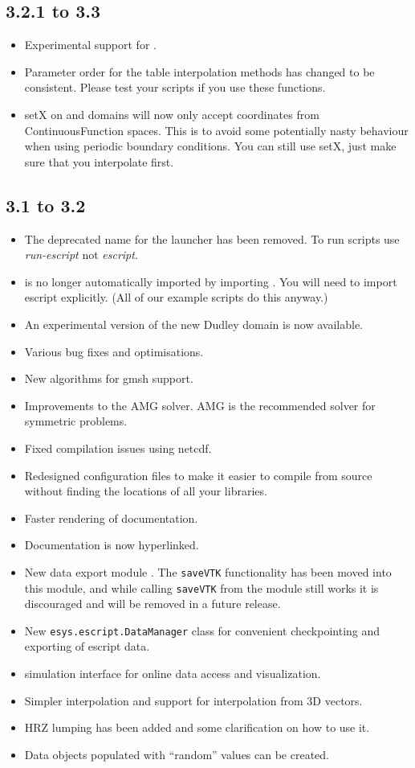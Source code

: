 \subsection*{3.2.1 to 3.3}
\begin{itemize}
 \item Experimental support for \pythonthree.
 \item Parameter order for the table interpolation methods has changed to be consistent. 
 Please test your scripts if you use these functions.
 \item setX on \finley and \dudley domains will now only accept coordinates from ContinuousFunction spaces.
 This is to avoid some potentially nasty behaviour when using periodic boundary conditions.
 You can still use setX, just make sure that you interpolate first.
\end{itemize}


\subsection*{3.1 to 3.2}
\begin{itemize}
\item The deprecated name for the launcher has been removed. To run scripts use
    \emph{run-escript} not \emph{escript}.
\item \escript is no longer automatically imported by importing \finley.
    You will need to import escript explicitly. (All of our example scripts do this anyway.)
\item An experimental version of the new Dudley domain is now available.
\item Various bug fixes and optimisations.
\item New algorithms for gmsh support.
\item Improvements to the AMG solver. AMG is the recommended solver for symmetric problems.
\item Fixed compilation issues using netcdf.
\item Redesigned configuration files to make it easier to compile from source
    without finding the locations of all your libraries.
\item Faster rendering of documentation.
\item Documentation is now hyperlinked.
\item New data export module \weipa. The \texttt{saveVTK} functionality has
    been moved into this module, and while calling \texttt{saveVTK} from the
    \escript module still works it is discouraged and will be removed in a
    future release.
\item New \texttt{esys.escript.DataManager} class for convenient checkpointing
    and exporting of escript data.
\item \VisIt simulation interface for online data access and visualization.
\item Simpler interpolation and support for interpolation from 3D vectors.
\item HRZ lumping has been added and some clarification on how to use it.
\item Data objects populated with ``random'' values can be created.
\end{itemize}

